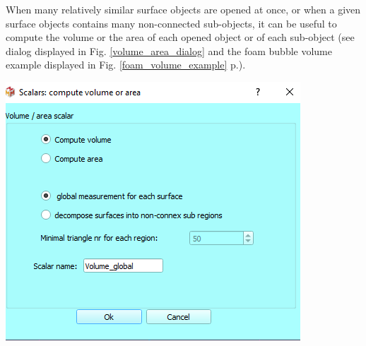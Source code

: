\noindent
\begin{minipage}{0.5\textwidth}
When many relatively similar surface objects are opened at once, or when a given surface objects contains many non-connected sub-objects, it can be useful to compute the volume or the area of each opened object or of each sub-object (see  dialog displayed in Fig. \ref{volume_area_dialog} and the foam bubble volume example displayed in Fig. \ref{foam_volume_example} p.\pageref{foam_volume_example}).

\end{minipage}    
\begin{minipage}{0.5\textwidth}\centering
  \includegraphics[scale=0.5]{images/11/volume_area_dialog.png}
\label{volume_area_dialog}
 \end{minipage} 
\noindent



